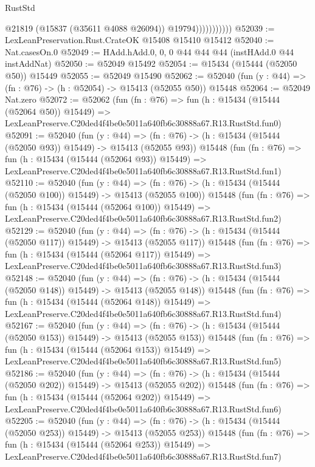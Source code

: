 \begin{lexlean}{RustStd}
\begin{coremodule}
                          @21819
                          (@15837 (@35611 @4088 @26094))
                          @19794)))))))))))
@52039 := LexLeanPreservation.Rust.CrateOK @15408 @15410 @15412
@52040 := Nat.casesOn.{0}
@52049 := HAdd.hAdd.{0, 0, 0} @44 @44 @44 (instHAdd.{0} @44 instAddNat)
@52050 := @52049 @15492
@52054 := @15434 (@15444 (@52050 @50)) @15449
@52055 := @52049 @15490
@52062 := @52040 (fun (y : @44) => (fn : @76) -> (h : @52054) -> @15413 (@52055 @50)) @15448
@52064 := @52049 Nat.zero
@52072 := @52062
    (fun (fn : @76) =>
    fun (h : @15434 (@15444 (@52064 @50)) @15449) =>
    LexLeanPreserve.C20ded4f4be0e5011a640fb6c30888a67.R13.RustStd.fun0)
@52091 := @52040
    (fun (y : @44) =>
    (fn : @76) -> (h : @15434 (@15444 (@52050 @93)) @15449) -> @15413 (@52055 @93))
    @15448
    (fun (fn : @76) =>
    fun (h : @15434 (@15444 (@52064 @93)) @15449) =>
    LexLeanPreserve.C20ded4f4be0e5011a640fb6c30888a67.R13.RustStd.fun1)
@52110 := @52040
    (fun (y : @44) =>
    (fn : @76) -> (h : @15434 (@15444 (@52050 @100)) @15449) -> @15413 (@52055 @100))
    @15448
    (fun (fn : @76) =>
    fun (h : @15434 (@15444 (@52064 @100)) @15449) =>
    LexLeanPreserve.C20ded4f4be0e5011a640fb6c30888a67.R13.RustStd.fun2)
@52129 := @52040
    (fun (y : @44) =>
    (fn : @76) -> (h : @15434 (@15444 (@52050 @117)) @15449) -> @15413 (@52055 @117))
    @15448
    (fun (fn : @76) =>
    fun (h : @15434 (@15444 (@52064 @117)) @15449) =>
    LexLeanPreserve.C20ded4f4be0e5011a640fb6c30888a67.R13.RustStd.fun3)
@52148 := @52040
    (fun (y : @44) =>
    (fn : @76) -> (h : @15434 (@15444 (@52050 @148)) @15449) -> @15413 (@52055 @148))
    @15448
    (fun (fn : @76) =>
    fun (h : @15434 (@15444 (@52064 @148)) @15449) =>
    LexLeanPreserve.C20ded4f4be0e5011a640fb6c30888a67.R13.RustStd.fun4)
@52167 := @52040
    (fun (y : @44) =>
    (fn : @76) -> (h : @15434 (@15444 (@52050 @153)) @15449) -> @15413 (@52055 @153))
    @15448
    (fun (fn : @76) =>
    fun (h : @15434 (@15444 (@52064 @153)) @15449) =>
    LexLeanPreserve.C20ded4f4be0e5011a640fb6c30888a67.R13.RustStd.fun5)
@52186 := @52040
    (fun (y : @44) =>
    (fn : @76) -> (h : @15434 (@15444 (@52050 @202)) @15449) -> @15413 (@52055 @202))
    @15448
    (fun (fn : @76) =>
    fun (h : @15434 (@15444 (@52064 @202)) @15449) =>
    LexLeanPreserve.C20ded4f4be0e5011a640fb6c30888a67.R13.RustStd.fun6)
@52205 := @52040
    (fun (y : @44) =>
    (fn : @76) -> (h : @15434 (@15444 (@52050 @253)) @15449) -> @15413 (@52055 @253))
    @15448
    (fun (fn : @76) =>
    fun (h : @15434 (@15444 (@52064 @253)) @15449) =>
    LexLeanPreserve.C20ded4f4be0e5011a640fb6c30888a67.R13.RustStd.fun7)

\end{coremodule}
\end{lexlean}
